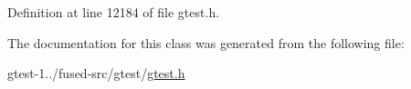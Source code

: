 \-Definition at line 12184 of file gtest.\-h.



\-The documentation for this class was generated from the following file\-:\begin{DoxyCompactItemize}
\item 
gtest-\/1../fused-\/src/gtest/\hyperlink{fused-src_2gtest_2gtest_8h}{gtest.\-h}\end{DoxyCompactItemize}
